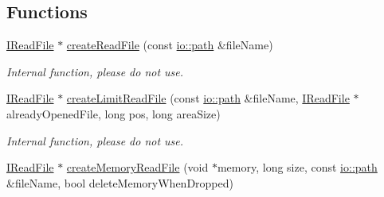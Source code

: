 \subsection*{Functions}
\begin{DoxyCompactItemize}
\item 
\hyperlink{classirr_1_1io_1_1IReadFile}{I\+Read\+File} $\ast$ \hyperlink{namespaceirr_1_1io_a16ff593e91ead74120ac459c4fe97bcf}{create\+Read\+File} (const \hyperlink{namespaceirr_1_1io_ab1bdc45edb3f94d8319c02bc0f840ee1}{io\+::path} \&file\+Name)\hypertarget{namespaceirr_1_1io_a16ff593e91ead74120ac459c4fe97bcf}{}\label{namespaceirr_1_1io_a16ff593e91ead74120ac459c4fe97bcf}

\begin{DoxyCompactList}\small\item\em Internal function, please do not use. \end{DoxyCompactList}\item 
\hyperlink{classirr_1_1io_1_1IReadFile}{I\+Read\+File} $\ast$ \hyperlink{namespaceirr_1_1io_aaffde8ef59ed98d4606a342caddca8e1}{create\+Limit\+Read\+File} (const \hyperlink{namespaceirr_1_1io_ab1bdc45edb3f94d8319c02bc0f840ee1}{io\+::path} \&file\+Name, \hyperlink{classirr_1_1io_1_1IReadFile}{I\+Read\+File} $\ast$already\+Opened\+File, long pos, long area\+Size)\hypertarget{namespaceirr_1_1io_aaffde8ef59ed98d4606a342caddca8e1}{}\label{namespaceirr_1_1io_aaffde8ef59ed98d4606a342caddca8e1}

\begin{DoxyCompactList}\small\item\em Internal function, please do not use. \end{DoxyCompactList}\item 
\hyperlink{classirr_1_1io_1_1IReadFile}{I\+Read\+File} $\ast$ \hyperlink{namespaceirr_1_1io_ab30f7cd10d675fa7da0a936a7bd67d4a}{create\+Memory\+Read\+File} (void $\ast$memory, long size, const \hyperlink{namespaceirr_1_1io_ab1bdc45edb3f94d8319c02bc0f840ee1}{io\+::path} \&file\+Name, bool delete\+Memory\+When\+Dropped)\hypertarget{namespaceirr_1_1io_ab30f7cd10d675fa7da0a936a7bd67d4a}{}\label{namespaceirr_1_1io_ab30f7cd10d675fa7da0a936a7bd67d4a}


\end{DoxyCompactItemize}
